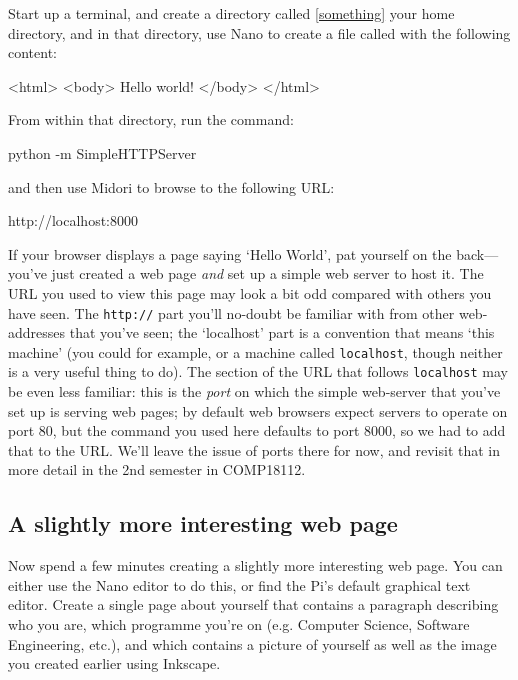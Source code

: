 Start up a terminal, and create a directory called \ref{something} your home directory, and in that directory, use Nano to create a file called  with the following content:

\begin{ttoutenv}
<html>
<body>
Hello world!
</body>
</html>
\end{ttoutenv}

From within that directory, run the command:

\begin{ttoutenv}
python -m SimpleHTTPServer
\end{ttoutenv}

and then use Midori to browse to the following URL:

\begin{ttoutenv}
http://localhost:8000
\end{ttoutenv}

If your browser displays a page saying `Hello World', pat yourself on the back---you've just created a web page \textit{and} set up a simple web server to host it. The URL you used to view this page may look a bit odd compared with others you have seen. The \texttt{http://} part you'll no-doubt be familiar with from other web-addresses that you've seen; the `localhost' part is a convention that means `this machine' (you could for example,  or  a machine called \texttt{localhost}, though neither is a very useful thing to do). The section of the URL that follows \texttt{localhost} may be even less familiar: this is the \textit{port} on which the simple web-server that you've set up is serving web pages; by default web browsers expect servers to operate on port 80, but the  command you used here defaults to port 8000, so we had to add that to the URL. We'll leave the issue of ports there for now, and revisit that in more detail in the 2nd semester in COMP18112. 

\subsection{A slightly more interesting web page}

Now spend a few minutes creating a slightly more interesting web page. You can either use the Nano editor to do this, or find the Pi's default graphical text editor. Create a single page about yourself that contains a paragraph describing who you are, which programme you're on (e.g. Computer Science, Software Engineering, etc.), and which contains a picture of yourself as well as the image you created earlier using Inkscape. 

